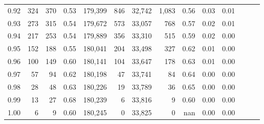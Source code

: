 \begin{tabular}{rrrrrrrrrrrrrr}
0.92 &    324 &  370 &  0.53 &  179,399 &      846 &  32,742 &   1,083 &  0.56 &  0.03 &      0.01 \\
0.93 &    273 &  315 &  0.54 &  179,672 &      573 &  33,057 &     768 &  0.57 &  0.02 &      0.01 \\
0.94 &    217 &  253 &  0.54 &  179,889 &      356 &  33,310 &     515 &  0.59 &  0.02 &      0.00 \\
0.95 &    152 &  188 &  0.55 &  180,041 &      204 &  33,498 &     327 &  0.62 &  0.01 &      0.00 \\
0.96 &    100 &  149 &  0.60 &  180,141 &      104 &  33,647 &     178 &  0.63 &  0.01 &      0.00 \\
0.97 &     57 &   94 &  0.62 &  180,198 &       47 &  33,741 &      84 &  0.64 &  0.00 &      0.00 \\
0.98 &     28 &   48 &  0.63 &  180,226 &       19 &  33,789 &      36 &  0.65 &  0.00 &      0.00 \\
0.99 &     13 &   27 &  0.68 &  180,239 &        6 &  33,816 &       9 &  0.60 &  0.00 &      0.00 \\
1.00 &      6 &    9 &  0.60 &  180,245 &        0 &  33,825 &       0 &   nan &  0.00 &      0.00 \\
\bottomrule
\end{tabular}
